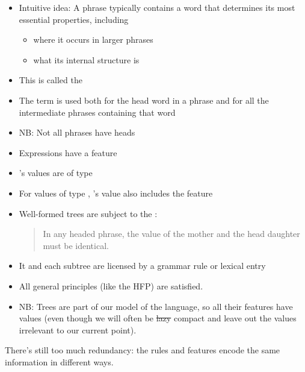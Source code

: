 \documentclass[a4paper,landscape,headrule,footrule,dvips]{foils}
\begin{document}
\begin{itemize}
\item Intuitive idea: A phrase typically contains a word that
determines its most essential properties, including
\begin{itemize}
\item where it occurs in larger phrases
\item what its internal structure is
\end{itemize}
\item This is called the 
\item The term  is used both for the head word in a
phrase and for all the intermediate phrases containing
that word
\item NB: Not all phrases have heads
\end{itemize}

\begin{itemize}
\item Expressions have a feature 
\item {}’s values are of type 
\item For  values of type , ’s
value also includes the feature 
\item Well-formed trees are subject to the :
\begin{quote}
  In any headed phrase, the 
value of the mother and the head daughter
must be identical.
\end{quote}
\end{itemize}

\begin{itemize}
\item It and each subtree are licensed by a grammar rule
or lexical entry
\item All general principles (like the HFP) are satisfied.
\item NB: Trees are part of our model of the language,
so all their features have values (even though we
will often be \sout{lazy} compact and leave out the values
irrelevant to our current point).
\end{itemize}


There’s still too much redundancy: the rules and features encode the same information in different ways.
\end{document}

